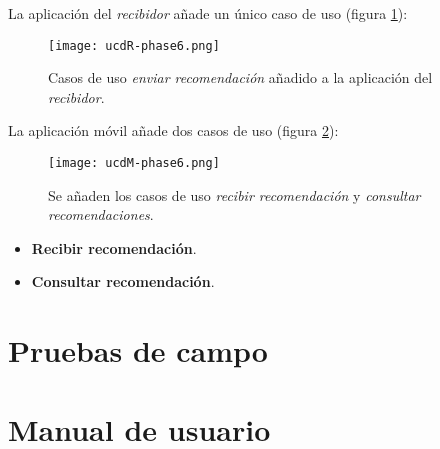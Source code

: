 


La aplicación del \emph{recibidor} añade un único caso de uso (figura
\ref{fig:ucdR-phase6}):

  \begin{figure}[H]
    \begin{center}
      \texttt{[image: ucdR-phase6.png]}
      \caption{Casos de uso \emph{enviar recomendación} añadido a la aplicación 
      del \emph{recibidor}.}
      \label{fig:ucdR-phase6}
    \end{center}
  \end{figure}



La aplicación móvil añade dos casos de uso (figura \ref{fig:ucdM-phase6}):

  \begin{figure}[H]
    \begin{center}
      \texttt{[image: ucdM-phase6.png]}
      \caption{Se añaden los casos de uso \emph{recibir recomendación} y
      \emph{consultar recomendaciones}.}
      \label{fig:ucdM-phase6}
    \end{center}
  \end{figure}

\begin{itemize}
\item \textbf{Recibir recomendación}. %
\item \textbf{Consultar recomendación}. %
\end{itemize}


\section{Pruebas de campo}

\section{Manual de usuario}
